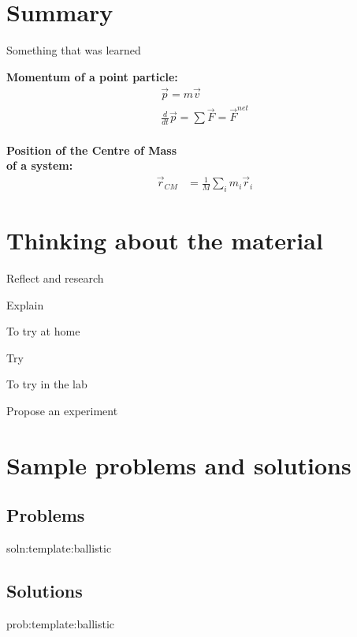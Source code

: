 \newpage
\section{Summary}

\begin{chapterSummary}
 Something that was learned
\end{chapterSummary}

\newpage
\begin{importantEquations}
\medskip
\begin{multicols}{2}
\textbf{Momentum of a point particle:}
\begin{align*}
\vec p = m\vec v \\
\frac{d}{dt}\vec p = \sum \vec F = \vec F^{net}
\end{align*}
\columnbreak
\\
\textbf{Position of the Centre of Mass \\ of a system:}
\begin{align*}
\vec r_{CM} &=\frac{1}{M}\sum_i m_i\vec r_i 
\end{align*}
\medskip
\end{multicols}
\end{importantEquations}

\newpage
\section{Thinking about the material}

\begin{chapteractivity}{Reflect and research}
{
\item Explain
}
\end{chapteractivity}

\begin{chapteractivity}{To try at home}
{
\item Try
}
\end{chapteractivity}

\begin{chapteractivity}{To try in the lab}
{
\item Propose an experiment
}
\end{chapteractivity}

\newpage
\section{Sample problems and solutions}
\subsection{Problems}
\begin{problem}{soln:template:ballistic}{\label{prob:template:ballistic} 

}
\end{problem}
\newpage
\subsection{Solutions}
\begin{solution}{prob:template:ballistic}\label{soln:template:ballistic}

\end{solution}

